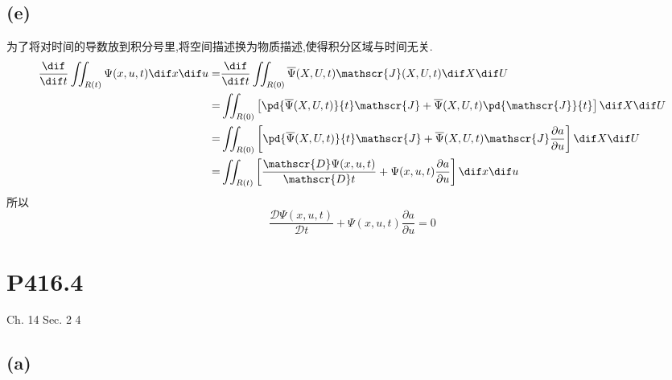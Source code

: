 \documentclass[12pt]{article}
\begin{document}
\subsection{(e)}

为了将对时间的导数放到积分号里,将空间描述换为物质描述,使得积分区域与时间无关.
\begin{equation}
	\begin{split}
		\frac{\dif }{\dif t}\iint_{R(t)} \Psi(x,u,t)\dif x\dif u = & \frac{\dif }{\dif t} \iint_{R(0)} \overline\Psi(X,U,t)\mathscr{J}(X,U,t)\dif X\dif U\\
		= &  \iint_{R(0)} \left[ \pd{\overline\Psi(X,U,t)}{t} \mathscr{J} + \overline\Psi(X,U,t)\pd{\mathscr{J}}{t} \right] \dif X\dif U\\
		= & \iint_{R(0)} \left[ \pd{\overline\Psi(X,U,t)}{t} \mathscr{J} + \overline\Psi(X,U,t)\mathscr{J}\frac{\partial a}{\partial u} \right] \dif X\dif U\\
		= & \iint_{R(t)} \left[ \frac{\mathscr{D} \Psi(x,u,t)}{\mathscr{D} t}  + \Psi(x,u,t)\frac{\partial a}{\partial u} \right]\dif x\dif u
	\end{split}
\end{equation}
所以
\begin{equation}
	\frac{\mathscr{D} \Psi(x,u,t)}{\mathscr{D} t}  + \Psi(x,u,t)\frac{\partial a}{\partial u} = 0
\end{equation}

\section{P416.4}

Ch. 14 Sec. 2 4

\subsection{(a)}
\end{document}
